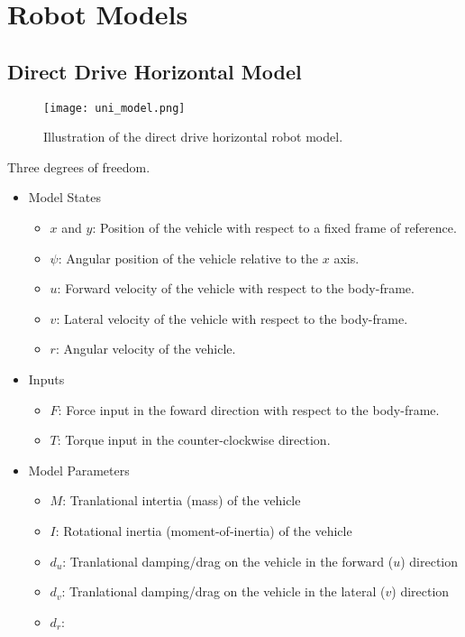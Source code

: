 \chapter{Robot Models}\label{c:models}
\section{Direct Drive Horizontal Model}

\begin{figure}[hbt]
\centering
\texttt{[image: uni\_model.png]}
\caption{Illustration of the direct drive horizontal robot model.}
\label{f:uni_model}
\end{figure}

Three degrees of freedom.

\begin{itemize}
\item Model States
\begin{itemize}
\item $x$ and $y$: Position of the vehicle with respect to a fixed frame of reference.
\item $\psi$: Angular position of the vehicle relative to the $x$ axis.
\item $u$: Forward velocity of the vehicle with respect to the body-frame.
\item $v$: Lateral velocity of the vehicle with respect to the body-frame.
\item $r$: Angular velocity of the vehicle.
\end{itemize}
\item Inputs
\begin{itemize}
\item $F$: Force input in the foward direction with respect to the body-frame.
\item $T$: Torque input in the counter-clockwise direction.
\end{itemize}
\item Model Parameters
\begin{itemize}
\item $M$: Tranlational intertia (mass) of the vehicle
\item $I$: Rotational inertia (moment-of-inertia) of the vehicle
\item $d_u$: Tranlational damping/drag on the vehicle in the forward ($u$) direction
\item $d_v$: Tranlational damping/drag on the vehicle in the lateral ($v$) direction
\item $d_r$: 
\end{itemize}
\end{itemize}

